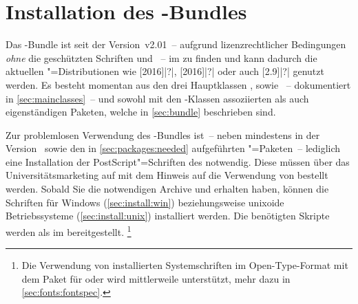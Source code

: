 \section{Installation des \TUDScript-Bundles}
%
%
%
%
%
Das \TUDScript-Bundle ist seit der Version~v2.01~-- aufgrund lizenzrechtlicher 
Bedingungen \emph{ohne} die geschützten Schriften \Univers und \DIN~-- im \CTAN
zu finden und kann dadurch die aktuellen "=Distributionen wie 
[2016]|?|, 
[2016]|?| oder auch
[2.9]|?| genutzt werden. Es besteht momentan aus 
den drei Hauptklassen ,  sowie 
~-- dokumentiert in \autoref{sec:mainclasses}~-- und sowohl 
mit den \TUDScript-Klassen assoziierten als auch eigenständigen Paketen, welche 
in \autoref{sec:bundle} beschrieben sind.

Zur problemlosen Verwendung des \TUDScript-Bundles ist~-- neben \KOMAScript{} 
mindestens in der Version~\vKOMAScript{} sowie den in 
\autoref{sec:packages:needed} aufgeführten "=Paketen~-- lediglich 
eine Installation der PostScript"=Schriften des \TUDCDs notwendig. Diese müssen 
über das Universitätsmarketing auf 
 mit 
dem Hinweis auf die Verwendung von  bestellt werden. Sobald Sie 
die notwendigen Archive  und  
erhalten haben, können die Schriften für Windows (\autoref{sec:install:win}) 
beziehungsweise unixoide Betriebssysteme (\autoref{sec:install:unix}) 
installiert werden. Die benötigten Skripte werden als 
im \GitHubRepo* bereitgestellt.%
\footnote{%
  Die Verwendung von installierten Systemschriften im Open-Type-Format mit dem 
  Paket  für  oder  wird 
  mittlerweile unterstützt, mehr dazu in \autoref{sec:fonts:fontspec}.%
}



